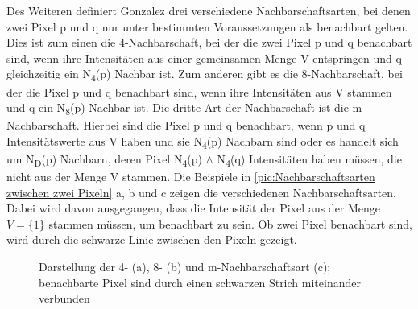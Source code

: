 \documentclass[ngerman,12pt]{article} %
\begin{document}
Des Weiteren definiert Gonzalez drei verschiedene Nachbarschaftsarten, bei denen zwei Pixel p und q nur unter bestimmten Voraussetzungen als benachbart gelten. Dies ist zum einen die 4-Nachbarschaft, bei der die zwei Pixel p und q benachbart sind, wenn ihre Intensitäten aus einer gemeinsamen Menge V entspringen und q gleichzeitig ein N\textsubscript{4}(p) Nachbar ist. Zum anderen gibt es die 8-Nachbarschaft, bei der die Pixel p und q benachbart sind, wenn ihre Intensitäten aus V stammen und q ein N\textsubscript{8}(p) Nachbar ist. Die dritte Art der Nachbarschaft ist die m-Nachbarschaft. Hierbei sind die Pixel p und q benachbart, wenn p und q Intensitätswerte aus V haben und sie N\textsubscript{4}(p) Nachbarn sind oder es handelt sich um N\textsubscript{D}(p) Nachbarn, deren Pixel N\textsubscript{4}(p) \(\wedge\)  N\textsubscript{4}(q) Intensitäten haben müssen, die nicht aus der Menge V stammen. Die Beispiele in \autoref{pic:Nachbarschaftsarten zwischen zwei Pixeln} a, b und c zeigen die verschiedenen Nachbarschaftsarten. Dabei wird davon ausgegangen, dass die Intensität der Pixel aus der Menge $ V =\{1\}$ stammen müssen, um benachbart zu sein. Ob zwei Pixel benachbart sind, wird durch die schwarze Linie zwischen den Pixeln gezeigt.\newline

\begin{figure}[h!tb]
  \centering
  \qquad
  \qquad
 \caption[Darstellung der 4-, 8- und m-Nachbarschaftsart]{\label{pic:Nachbarschaftsarten zwischen zwei Pixeln}Darstellung der 4- (a), 8- (b) und m-Nachbarschaftsart (c); benachbarte Pixel sind durch einen schwarzen Strich miteinander verbunden}
\end{figure}
\end{document}
